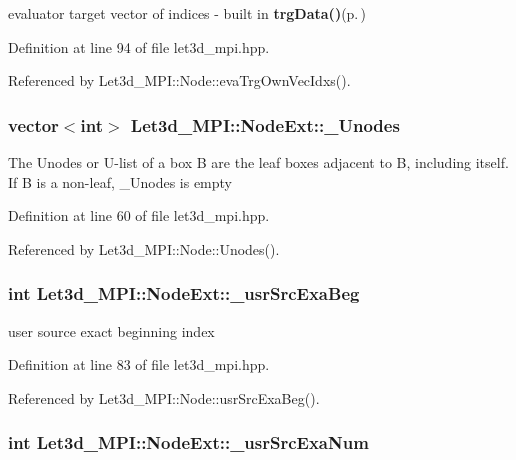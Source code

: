 evaluator target vector of indices - built in {\bf trg\-Data()}{\rm (p.\,\pageref{classLet3d__MPI_ca481263feff458d83769363d3ad85f7_ca481263feff458d83769363d3ad85f7})} 

Definition at line 94 of file let3d\_\-mpi.hpp.

Referenced by Let3d\_\-MPI::Node::eva\-Trg\-Own\-Vec\-Idxs().
\subsubsection{\setlength{\rightskip}{0pt plus 5cm}vector$<$int$>$ {\bf Let3d\_\-MPI::Node\-Ext::\_\-Unodes}}\label{classLet3d__MPI_1_1NodeExt_c79cd8d8d8491cc45e72786d6748e671_c79cd8d8d8491cc45e72786d6748e671}


The Unodes or U-list of a box B are the leaf boxes adjacent to B, including itself. If B is a non-leaf, \_\-Unodes is empty 

Definition at line 60 of file let3d\_\-mpi.hpp.

Referenced by Let3d\_\-MPI::Node::Unodes().
\subsubsection{\setlength{\rightskip}{0pt plus 5cm}int {\bf Let3d\_\-MPI::Node\-Ext::\_\-usr\-Src\-Exa\-Beg}}\label{classLet3d__MPI_1_1NodeExt_2be367c6a2a1706c60e187b80ad809aa_2be367c6a2a1706c60e187b80ad809aa}


user source exact beginning index 

Definition at line 83 of file let3d\_\-mpi.hpp.

Referenced by Let3d\_\-MPI::Node::usr\-Src\-Exa\-Beg().
\subsubsection{\setlength{\rightskip}{0pt plus 5cm}int {\bf Let3d\_\-MPI::Node\-Ext::\_\-usr\-Src\-Exa\-Num}}\label{classLet3d__MPI_1_1NodeExt_021b1981ff3fc6e615a6a8d84072cfb3_021b1981ff3fc6e615a6a8d84072cfb3}


